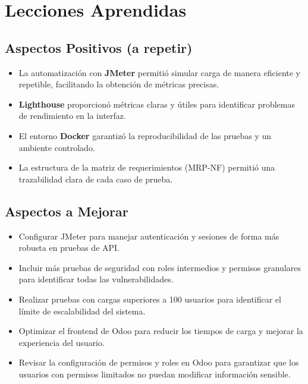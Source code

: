 \documentclass[12pt, letterpaper]{article}
\begin{document}
\newpage

\section{Lecciones Aprendidas}

\subsection{Aspectos Positivos (a repetir)}

\begin{itemize}
    \item La automatización con \textbf{JMeter} permitió simular carga de manera eficiente y repetible, facilitando la obtención de métricas precisas.
    \item \textbf{Lighthouse} proporcionó métricas claras y útiles para identificar problemas de rendimiento en la interfaz.
    \item El entorno \textbf{Docker} garantizó la reproducibilidad de las pruebas y un ambiente controlado.
    \item La estructura de la matriz de requerimientos (MRP-NF) permitió una trazabilidad clara de cada caso de prueba.
\end{itemize}

\subsection{Aspectos a Mejorar}

\begin{itemize}
    \item Configurar JMeter para manejar autenticación y sesiones de forma más robusta en pruebas de API.
    \item Incluir más pruebas de seguridad con roles intermedios y permisos granulares para identificar todas las vulnerabilidades.
    \item Realizar pruebas con cargas superiores a 100 usuarios para identificar el límite de escalabilidad del sistema.
    \item Optimizar el frontend de Odoo para reducir los tiempos de carga y mejorar la experiencia del usuario.
    \item Revisar la configuración de permisos y roles en Odoo para garantizar que los usuarios con permisos limitados no puedan modificar información sensible.
\end{itemize}
\end{document}
